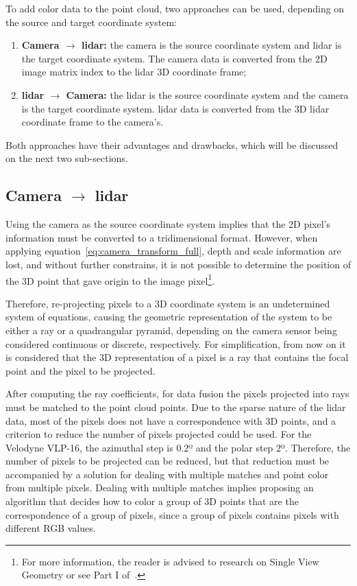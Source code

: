 To add color data to the point cloud, two approaches can be used, depending on the source and target coordinate system:

\begin{enumerate} 
	\item \textbf{Camera $\rightarrow$ \ac{lidar}:} the camera is the source coordinate system and \ac{lidar} is the target coordinate system. The camera data is converted from the 2D image  matrix index to the \ac{lidar} 3D coordinate frame;
	\item \textbf{\ac{lidar} $\rightarrow$ Camera:} the \ac{lidar} is the source coordinate system and the camera is the target coordinate system. \ac{lidar} data is converted from the 3D \ac{lidar} coordinate frame to the camera's.
\end{enumerate}

Both approaches have their advantages and drawbacks, which will be discussed on the next two sub-sections.

\subsection{Camera $\rightarrow$ \ac{lidar}} 
Using the camera as the source coordinate system implies that the 2D pixel's information must be converted to a tridimensional format. However, when applying equation~\ref{eq:camera_transform_full}, depth and scale information are lost, and without further constrains, it is not possible to determine the position of the 3D point that gave origin to the image pixel\footnote{For more information, the reader is advised to research on Single View Geometry or see Part I of~\cite{mvg_book}.}. 

Therefore, re-projecting pixels to a 3D coordinate system is an undetermined system of equations, causing the geometric representation of the system to be either a ray or a quadrangular pyramid, depending on the camera sensor being considered continuous or discrete, respectively. For simplification, from now on it is considered that the 3D representation of a pixel is a ray that contains the focal point and the pixel to be projected.

After computing the ray coefficients, for data fusion the pixels projected into rays must be matched to the point cloud points. Due to the sparse nature of the \ac{lidar} data, most of the pixels does not have a correspondence with 3D points, and a criterion to reduce the number of pixels projected could be used. For the Velodyne VLP-16, the azimuthal step is $0.2$º and the polar step $2$º. Therefore, the number of pixels to be projected can be reduced, but that reduction must be accompanied by a solution for dealing with multiple matches and point color from multiple pixels. Dealing with multiple matches implies proposing an algorithm that decides  how to color a group of 3D points that are the correspondence of a group of pixels, since a group of pixels contains pixels with different RGB values.

